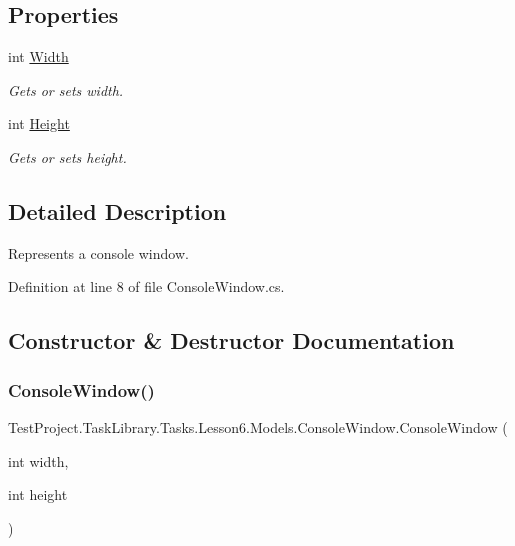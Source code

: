 \subsection*{Properties}
\begin{DoxyCompactItemize}
\item 
int \mbox{\hyperlink{class_test_project_1_1_task_library_1_1_tasks_1_1_lesson6_1_1_models_1_1_console_window_a30c7c6b8d7c78d4c87f15d1900d31bba}{Width}}
\begin{DoxyCompactList}\small\item\em Gets or sets width. \end{DoxyCompactList}\item 
int \mbox{\hyperlink{class_test_project_1_1_task_library_1_1_tasks_1_1_lesson6_1_1_models_1_1_console_window_a68e042b3ee7aa4f1f1272de30a0b1436}{Height}}
\begin{DoxyCompactList}\small\item\em Gets or sets height. \end{DoxyCompactList}\end{DoxyCompactItemize}


\subsection{Detailed Description}
Represents a console window. 



Definition at line 8 of file Console\+Window.\+cs.



\subsection{Constructor \& Destructor Documentation}
\mbox{\label{class_test_project_1_1_task_library_1_1_tasks_1_1_lesson6_1_1_models_1_1_console_window_ae787b3b8f3edce88b42d939ee609a4b9}} 
\subsubsection{\texorpdfstring{ConsoleWindow()}{ConsoleWindow()}}
{\footnotesize\ttfamily Test\+Project.\+Task\+Library.\+Tasks.\+Lesson6.\+Models.\+Console\+Window.\+Console\+Window (\begin{DoxyParamCaption}\item[{int}]{width,  }\item[{int}]{height }\end{DoxyParamCaption})}



